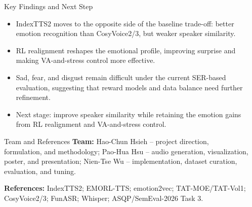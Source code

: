 \documentclass[final,20pt]{beamer}
\newlength{\sepwidth}
\newlength{\colwidth}
\newcommand{\separatorcolumn}{\begin{column}{\sepwidth}\end{column}}
\begin{document}
\begin{frame}[t]
\begin{columns}[t]
\begin{column}{\colwidth}
  \begin{exampleblock}{Key Findings and Next Step}
    \begin{itemize}
      \item IndexTTS2 moves to the opposite side of the baseline trade-off:
      better emotion recognition than CosyVoice2/3, but weaker speaker
      similarity.
      \item RL realignment reshapes the emotional profile, improving surprise
      and making VA-and-stress control more effective.
      \item Sad, fear, and disgust remain difficult under the current SER-based
      evaluation, suggesting that reward models and data balance need further
      refinement.
      \item Next stage: improve speaker similarity while retaining the emotion
      gains from RL realignment and VA-and-stress control.
    \end{itemize}
  \end{exampleblock}

  \begin{block}{Team and References}
    \small
    \textbf{Team:}
    Hao-Chun Hsieh -- project direction, formulation, and methodology;
    Pao-Hua Hsu -- audio generation, visualization, poster, and presentation;
    Nien-Tse Wu -- implementation, dataset curation, evaluation, and tuning.

    \vspace{0.4em}
    \textbf{References:}
    IndexTTS2; EMORL-TTS; emotion2vec; TAT-MOE/TAT-Vol1; CosyVoice2/3;
    FunASR; Whisper; ASQP/SemEval-2026 Task 3.
  \end{block}

\end{column}
\separatorcolumn

\end{columns}
\end{frame}
\end{document}
